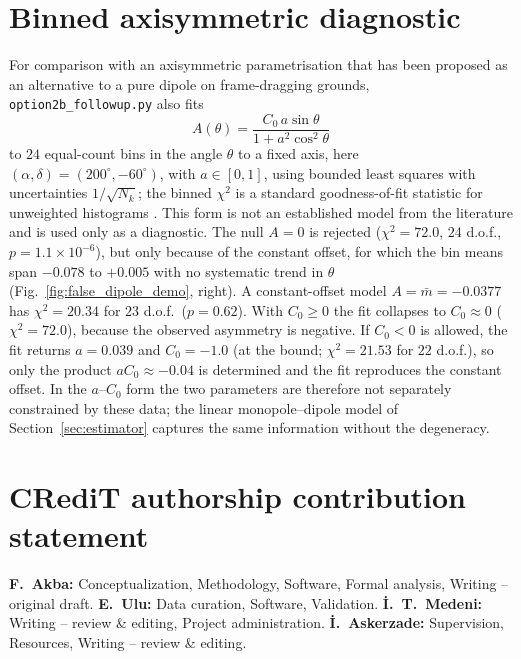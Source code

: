 \documentclass[preprint,12pt]{elsarticle}
\begin{document}
\appendix
\section{Binned axisymmetric diagnostic}
\label{app:nonlin}

For comparison with an axisymmetric parametrisation that has been proposed as an alternative to a pure dipole on frame-dragging grounds, \texttt{option2b\_followup.py} also fits
\begin{equation}
    A(\theta) = \frac{C_0\,a\sin\theta}{1 + a^2\cos^2\theta}
    \label{eq:nonlin}
\end{equation}
to $24$ equal-count bins in the angle $\theta$ to a fixed axis, here $(\alpha,\delta) = (200^\circ, -60^\circ)$, with $a\in[0,1]$, using bounded least squares with uncertainties $1/\sqrt{N_k}$; the binned $\chi^2$ is a standard goodness-of-fit statistic for unweighted histograms \cite{Gagunashvili2012}.
This form is not an established model from the literature and is used only as a diagnostic.
The null $A=0$ is rejected ($\chi^2 = 72.0$, $24$ d.o.f., $p = 1.1\times10^{-6}$), but only because of the constant offset, for which the bin means span $-0.078$ to $+0.005$ with no systematic trend in $\theta$ (Fig.~\ref{fig:false_dipole_demo}, right).
A constant-offset model $A = \bar m = -0.0377$ has $\chi^2 = 20.34$ for $23$ d.o.f.\ ($p = 0.62$).
With $C_0 \ge 0$ the fit collapses to $C_0\approx0$ ($\chi^2 = 72.0$), because the observed asymmetry is negative.
If $C_0<0$ is allowed, the fit returns $a = 0.039$ and $C_0 = -1.0$ (at the bound; $\chi^2 = 21.53$ for $22$ d.o.f.), so only the product $aC_0\approx-0.04$ is determined and the fit reproduces the constant offset.
In the $a$--$C_0$ form the two parameters are therefore not separately constrained by these data; the linear monopole--dipole model of Section~\ref{sec:estimator} captures the same information without the degeneracy.

\section*{CRediT authorship contribution statement}
\textbf{F.~Akba:} Conceptualization, Methodology, Software, Formal analysis, Writing -- original draft.
\textbf{E.~Ulu:} Data curation, Software, Validation.
\textbf{\.{I}.~T.~Medeni:} Writing -- review \& editing, Project administration.
\textbf{\.{I}.~Askerzade:} Supervision, Resources, Writing -- review \& editing.
\end{document}
